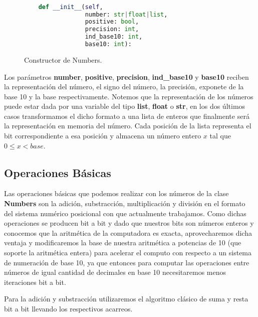 \documentclass[a4paper,10pt,twocolumn]{article}
\begin{document}
		\begin{figure}[htb]%
			\begin{lstlisting}[language=python]%

    def __init__(self, 
                 number: str|float|list,         
                 positive: bool, 
                 precision: int, 
                 ind_base10: int, 
                 base10: int):

			\end{lstlisting}
		\caption{Constructor de Numbers.\label{fig:code}}
		\end{figure}
	
	Los parámetros \textbf{number}, \textbf{positive}, \textbf{precision}, \textbf{ind\_base10} y \textbf{base10} 
  reciben la representación del número, el signo del número, la precisión, exponete de la base 10 y la base respectivamente. Notemos que la representación de los números puede estar dada por una variable del tipo \textbf{list}, \textbf{float} o \textbf{str}, en los dos últimos casos transformamos el dicho formato a  una lista de enteros que finalmente será la representación en memoria del número. Cada posición de la lista representa el bit correspondiente a esa posición y almacena un número entero $x$ tal que $0\leq x <base$.  
  
  
\subsection{Operaciones Básicas}\label{sub:result}

	Las operaciones básicas que podemos realizar con los números de la clase \textbf{Numbers} son la adición, substracción, multiplicación y división en el formato del sistema numérico posicional con que actualmente trabajamos. Como dichas operaciones se producen bit a bit y dado que nuestros bits son números enteros y conocemos que la aritmética de la computadora es exacta, aprovecharemos dicha ventaja y modificaremos la base de nuestra aritmética a potencias de 10 (que soporte la aritmética entera) para acelerar el computo con respecto a un sistema de numeración de base 10, ya que entonces para computar las operaciones entre números de igual cantidad de decimales en base 10 necesitaremos menos iteraciones bit a bit.
  
	Para la adición y substracción utilizaremos el algoritmo clásico de suma y resta bit a bit llevando los respectivos acarreos.
\end{document}
